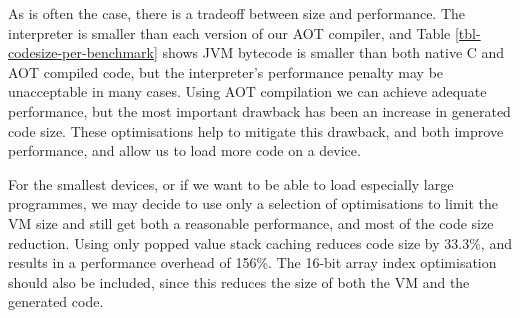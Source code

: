 As is often the case, there is a tradeoff between size and performance. The interpreter is smaller than each version of our AOT compiler, and Table \ref{tbl-codesize-per-benchmark} shows JVM bytecode is smaller than both native C and AOT compiled code, but the interpreter's performance penalty may be unacceptable in many cases. Using AOT compilation we can achieve adequate performance, but the most important drawback has been an increase in generated code size. These optimisations help to mitigate this drawback, and both improve performance, and allow us to load more code on a device.

For the smallest devices, or if we want to be able to load especially large programmes, we may decide to use only a selection of optimisations to limit the VM size and still get both a reasonable performance, and most of the code size reduction. Using only popped value stack caching reduces code size by 33.3\%, and results in a performance overhead of 156\%. The  16-bit array index optimisation should also be included, since this reduces the size of both the VM and the generated code.

